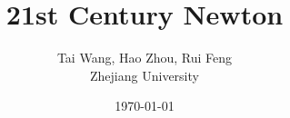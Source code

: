 \documentclass[a4paper,12pt]{article}%
\title{21st Century Newton}
\author{Tai Wang, Hao Zhou, Rui Feng \\ \small Zhejiang University}
\date{\today}
\theoremstyle{definition}
\begin{document}
\maketitle
                                              
\newpage                                                          
\tableofcontents                                                  
\newpage                                                          







\balance


\end{document}
